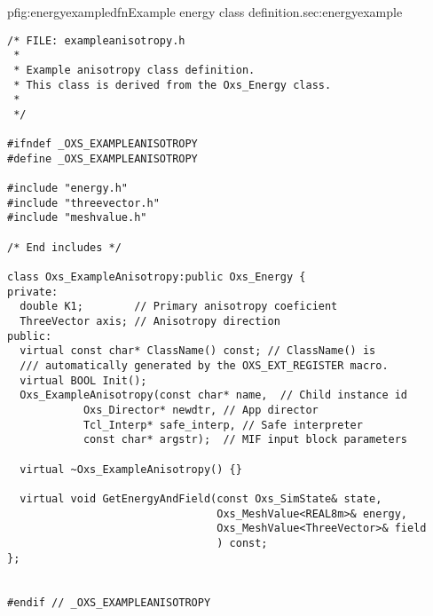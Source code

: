 \begin{codelisting}{p}{fig:energyexampledfn}{Example energy class
definition.}{sec:energyexample}
\begin{verbatim}
/* FILE: exampleanisotropy.h
 *
 * Example anisotropy class definition.
 * This class is derived from the Oxs_Energy class.
 *
 */

#ifndef _OXS_EXAMPLEANISOTROPY
#define _OXS_EXAMPLEANISOTROPY

#include "energy.h"
#include "threevector.h"
#include "meshvalue.h"

/* End includes */

class Oxs_ExampleAnisotropy:public Oxs_Energy {
private:
  double K1;        // Primary anisotropy coeficient
  ThreeVector axis; // Anisotropy direction
public:
  virtual const char* ClassName() const; // ClassName() is
  /// automatically generated by the OXS_EXT_REGISTER macro.
  virtual BOOL Init();
  Oxs_ExampleAnisotropy(const char* name,  // Child instance id
			Oxs_Director* newdtr, // App director
			Tcl_Interp* safe_interp, // Safe interpreter
			const char* argstr);  // MIF input block parameters

  virtual ~Oxs_ExampleAnisotropy() {}

  virtual void GetEnergyAndField(const Oxs_SimState& state,
                                 Oxs_MeshValue<REAL8m>& energy,
                                 Oxs_MeshValue<ThreeVector>& field
                                 ) const;
};


#endif // _OXS_EXAMPLEANISOTROPY
\end{verbatim}
\end{codelisting}

